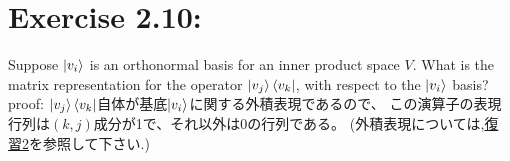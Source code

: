 \section{\large Exercise 2.10:}
Suppose $\ket{v_i}$ is an orthonormal basis for an inner product space $V$.
What is the matrix representation for the operator $\ket{v_j}\bra{v_k}$, 
with respect to the $\ket{v_i}$ basis?
\newline
{\Large proof:}
$\ket{v_j}\bra{v_k}$自体が基底$\ket{v_i}$に関する外積表現であるので、
この演算子の表現行列は$(k, j)$成分が1で、それ以外は0の行列である。
(外積表現については,\hyperlink{hukushuu2}{復習2}を参照して下さい.)
